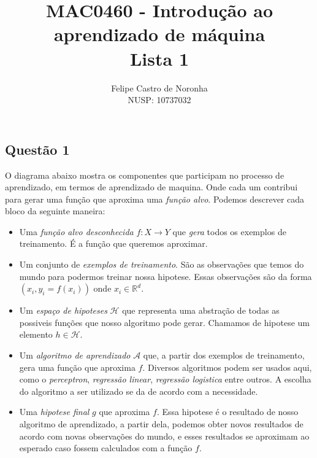\documentclass[12pt, a4paper]{article}
\title{MAC0460 - Introdução ao aprendizado de máquina\\Lista 1}
\author{Felipe Castro de Noronha\\NUSP: 10737032}
\date{}
\begin{document}
\maketitle

\subsection*{Questão 1}{
    O diagrama abaixo mostra os componentes que participam no processo de aprendizado, em termos de aprendizado de maquina. Onde cada um contribui para gerar uma função que aproxima uma \emph{função alvo}. Podemos descrever cada bloco da seguinte maneira:
    \begin{itemize}
        \item Uma \emph{função alvo desconhecida} $ f: X \rightarrow Y $ que \emph{gera} todos os exemplos de treinamento. É a função que queremos aproximar.
        \item Um conjunto de \emph{exemplos de treinamento}. São as observações que temos do mundo para podermos treinar nossa hipotese. Essas observações são da forma $ (x_{i}, y_{i} = f(x_{i})) $ onde $ x_{i} \in \mathbb{R}^{d} $.
        \item Um \emph{espaço de hipoteses} $ \mathcal{H} $ que representa uma abstração de todas as possiveis funções que nosso algoritmo pode gerar. Chamamos de hipotese um elemento $ h \in \mathcal{H} $.
        \item Um \emph{algoritmo de aprendizado} $ \mathcal{A} $ que, a partir dos exemplos de treinamento, gera uma função que aproxima $ f $. Diversos algoritmos podem ser usados aqui, como o \emph{perceptron}, \emph{regressão linear}, \emph{regressão logistica} entre outros. A escolha do algoritmo a ser utilizado se da de acordo com a necessidade.
        \item Uma \emph{hipotese final} $ g $ que aproxima $ f $. Essa hipotese é o resultado de nosso algoritmo de aprendizado, a partir dela, podemos obter novos resultados de acordo com novas observações do mundo, e esses resultados se aproximam ao esperado caso fossem calculados com a função $ f $.
    \end{itemize}
}
\end{document}
